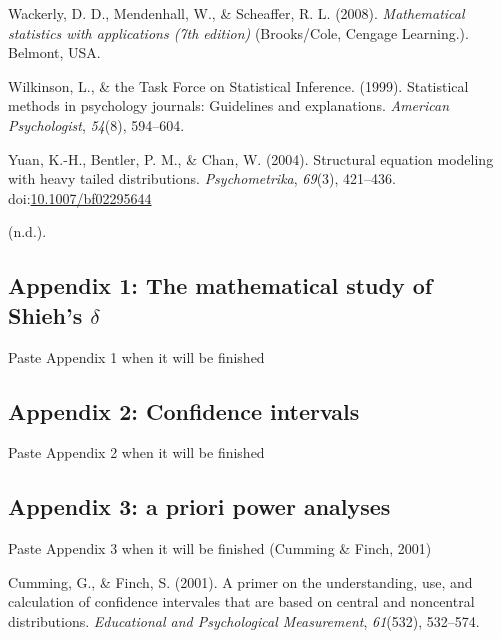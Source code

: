 \documentclass[
  man]{apa6}
\begin{document}
\leavevmode\hypertarget{ref-Wackerly_et_al_2008}{}%
Wackerly, D. D., Mendenhall, W., \& Scheaffer, R. L. (2008). \emph{Mathematical statistics with applications (7th edition)} (Brooks/Cole, Cengage Learning.). Belmont, USA.

\leavevmode\hypertarget{ref-Wilkinson_1999}{}%
Wilkinson, L., \& the Task Force on Statistical Inference. (1999). Statistical methods in psychology journals: Guidelines and explanations. \emph{American Psychologist}, \emph{54}(8), 594--604.

\leavevmode\hypertarget{ref-Yuan_et_al_2004}{}%
Yuan, K.-H., Bentler, P. M., \& Chan, W. (2004). Structural equation modeling with heavy tailed distributions. \emph{Psychometrika}, \emph{69}(3), 421--436. doi:\href{https://doi.org/10.1007/bf02295644}{10.1007/bf02295644}

\leavevmode\hypertarget{ref-Keselman_et_al_2008}{}%
(n.d.).

\clearpage
\makeatletter
\efloat@restorefloats
\makeatother


\begin{appendix}
\section{}
\setlength{\parindent}{0.0in}
\setlength{\leftskip}{0.0in}

\hypertarget{appendix-1-the-mathematical-study-of-shiehs-delta}{%
\subsection{\texorpdfstring{Appendix 1: The mathematical study of
Shieh's
\(\delta\)}{Appendix 1: The mathematical study of Shieh's \textbackslash delta}}\label{appendix-1-the-mathematical-study-of-shiehs-delta}}

Paste Appendix 1 when it will be finished

\hypertarget{appendix-2-confidence-intervals}{%
\subsection{Appendix 2: Confidence
intervals}\label{appendix-2-confidence-intervals}}

Paste Appendix 2 when it will be finished

\hypertarget{appendix-3-a-priori-power-analyses}{%
\subsection{Appendix 3: a priori power
analyses}\label{appendix-3-a-priori-power-analyses}}

Paste Appendix 3 when it will be finished (Cumming \& Finch, 2001)

\hypertarget{refs}{}
\leavevmode\hypertarget{ref-Cumming_Finch_2001}{}%
Cumming, G., \& Finch, S. (2001). A primer on the understanding, use,
and calculation of confidence intervales that are based on central and
noncentral distributions. \emph{Educational and Psychological
Measurement}, \emph{61}(532), 532--574.
\end{appendix}
\end{document}

